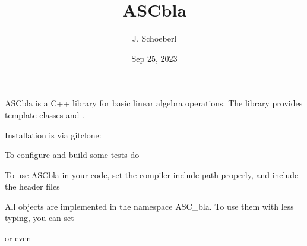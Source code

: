 \documentclass[letterpaper,10pt,english]{sphinxmanual}
\title{ASC\sphinxhyphen{}bla}
\date{Sep 25, 2023}
\author{J.\@{} Schoeberl}
\begin{document}
\pagestyle{empty}
\sphinxmaketitle
\pagestyle{plain}
\sphinxtableofcontents
\pagestyle{normal}
\label{\detokenize{index::doc}}


\sphinxAtStartPar
ASC\sphinxhyphen{}bla is a C++ library for basic linear algebra operations.
The library provides template classes  and .

\sphinxAtStartPar
Installation is via git\sphinxhyphen{}clone:

\begin{sphinxVerbatim}[commandchars=\\\{\}]
  
\end{sphinxVerbatim}

\sphinxAtStartPar
To configure and build some tests do

\begin{sphinxVerbatim}[commandchars=\\\{\}]
 
 
 
 
\end{sphinxVerbatim}

\sphinxAtStartPar
To use ASC\sphinxhyphen{}bla in your code, set the compiler include path properly, and include the header files

\begin{sphinxVerbatim}[commandchars=\\\{\}]
\end{sphinxVerbatim}

\sphinxAtStartPar
All objects are implemented in the namespace ASC\_bla. To use them with less typing, you can set

\begin{sphinxVerbatim}[commandchars=\\\{\}]
   
\end{sphinxVerbatim}

\sphinxAtStartPar
or even

\begin{sphinxVerbatim}[commandchars=\\\{\}]
  
\end{sphinxVerbatim}
\end{document}
